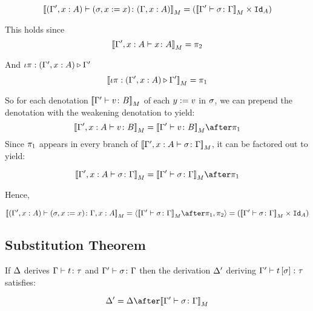 {    \begin{equation}
        {\bf [\![}(\Gamma', x:A) \vdash (\sigma, x:= x) \colon (\Gamma, x: A){\bf ]\!]}_M = ({\bf [\![}\Gamma' \vdash \sigma \colon \Gamma{\bf ]\!]}_M\times \texttt{Id}_{A})
    \end{equation}

    This holds since 
    \begin{equation}
        {\bf [\![}\Gamma', x:A \vdash x \colon A{\bf ]\!]}_M = \pi_2
    \end{equation}

    And $\iota\pi : (\Gamma',x:A) \triangleright \Gamma'$
    \begin{equation}
        {\bf [\![}\iota\pi : (\Gamma',x:A) \triangleright \Gamma'{\bf ]\!]}_M = \pi_1
    \end{equation}

    So for each denotation ${\bf [\![}\Gamma' \vdash v \colon B{\bf ]\!]}_M$ of each $y:= v$ in $\sigma$, we can prepend the denotation with the weakening denotation to yield: 
    \begin{equation}
        \deno{\typerelation{\G',x:A}{v}{B}} = \deno{\typerelation{\G'}{v}{B}}\after\p
    \end{equation}
    Since $\pi_1$ appears in every branch of ${\bf [\![}\Gamma', x:A \vdash \sigma \colon \Gamma{\bf ]\!]}_M$, it can be factored out to yield:

    \begin{equation}
        \deno{\typerelation{\G', x:A}{\si}{\G}} = \deno{\typerelation{\G'}{\si}{\G}}\after\p
    \end{equation}

    Hence,

    \begin{equation}
        \deno{\typerelation{(\G', x:A)}{(\si, x\setto x)}{\gax}} = \pr{\deno{\typerelation{\G'}{\si}{\G}}\after\p}{\pp} = (\deno{\typerelation{\G'}{\si}{\G}}\times \Id{A})
    \end{equation}
    \subsection{Substitution Theorem}

    If $\Delta$ derives $\Gamma \vdash t \colon \tau$ and $\Gamma' \vdash \sigma \colon \Gamma$ then the derivation $\Delta'$ deriving $\Gamma' \vdash t\left[\sigma\right] \colon \tau$ satisfies:

    \begin{equation}
        \D' = \D \after\deno{\typerelation{\G'}{\si}{\G}}
    \end{equation}

}
